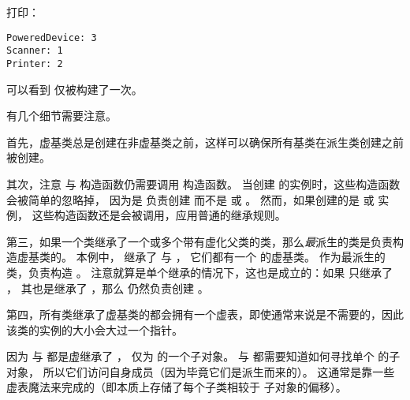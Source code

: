 \documentclass[../../LearnCpp.tex]{subfiles}
\begin{document}
打印：

\begin{lstlisting}
PoweredDevice: 3
Scanner: 1
Printer: 2
\end{lstlisting}

可以看到  仅被构建了一次。

有几个细节需要注意。

首先，虚基类总是创建在非虚基类之前，这样可以确保所有基类在派生类创建之前被创建。

其次，注意  与  构造函数仍需要调用  构造函数。
当创建  的实例时，这些构造函数会被简单的忽略掉，
因为是  负责创建  而不是  或 。
然而，如果创建的是  或  实例，
这些构造函数还是会被调用，应用普通的继承规则。

第三，如果一个类继承了一个或多个带有虚化父类的类，那么\textit{最}派生的类是负责构造虚基类的。
本例中， 继承了  与 ，
它们都有一个  的虚基类。
 作为最派生的类，负责构造 。
注意就算是单个继承的情况下，这也是成立的：如果  只继承了 ，
其也是继承了 ，那么  仍然负责创建 。

第四，所有类继承了虚基类的都会拥有一个虚表，即使通常来说是不需要的，因此该类的实例的大小会大过一个指针。

因为  与  都是虚继承了 ，
 仅为  的一个子对象。
 与  都需要知道如何寻找单个  的子对象，
所以它们访问自身成员（因为毕竟它们是派生而来的）。
这通常是靠一些虚表魔法来完成的（即本质上存储了每个子类相较于  子对象的偏移）。
\end{document}
